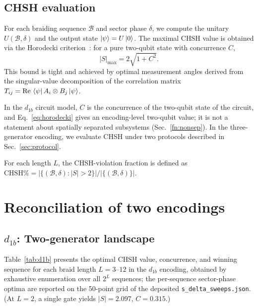 \documentclass[aps,pra,twocolumn,superscriptaddress,longbibliography,floatfix,nofootinbib]{revtex4-2}
\begin{document}
\subsection{CHSH evaluation}

For each braiding sequence $\mathcal{B}$ and sector phase $\delta$,
we compute the unitary $U(\mathcal{B},\delta)$ and the output
state $\ket{\psi} = U\ket{0}$.
The maximal CHSH value is obtained via the
Horodecki criterion~\cite{Horodecki1995}: for a pure two-qubit
state with concurrence $C$,
\begin{equation}
\label{eq:horodecki}
|S|_{\max} = 2\sqrt{1+C^2}.
\end{equation}
This bound is tight and achieved by optimal measurement
angles derived from the singular-value decomposition of the
correlation matrix $T_{ij} = \text{Re}\,\bra{\psi}A_i\otimes B_j\ket{\psi}$.

In the $d_{1b}$ circuit model, $C$ is the concurrence of the two-qubit
state of the circuit, and Eq.~\eqref{eq:horodecki} gives an
encoding-level two-qubit value; it is not a statement about spatially
separated subsystems (Sec.~\ref{fn:nonsep}).
In the three-generator encoding, we evaluate CHSH under two
protocols described in Sec.~\ref{sec:protocol}.

For each length $L$, the CHSH-violation fraction is defined as
$\text{CHSH\%} = |\{(\mathcal{B},\delta) : |S|>2\}| / |\{(\mathcal{B},\delta)\}|$.

\section{Reconciliation of two encodings}
\label{sec:reconciliation}

\subsection{$d_{1b}$: Two-generator landscape}

Table~\ref{tab:d1b} presents the optimal CHSH value, concurrence,
and winning sequence for each braid length $L=3$--$12$ in the
$d_{1b}$ encoding, obtained by exhaustive enumeration over all
$2^L$ sequences; the per-sequence sector-phase optima are reported
on the 50-point grid of the deposited \texttt{s\_delta\_sweeps.json}.
(At $L=2$, a single gate yields $|S|=2.097$, $C=0.315$.)
\end{document}

